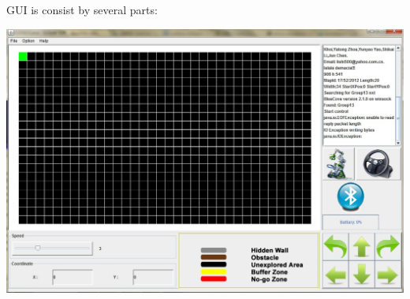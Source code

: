 \documentclass[11pt, a4paper]{report}
\begin{document}
GUI is consist by several parts:
\begin{center}
\includegraphics[scale=0.3]{./image/Overview.png}\\[1cm]
\end{center}
\end{document}

